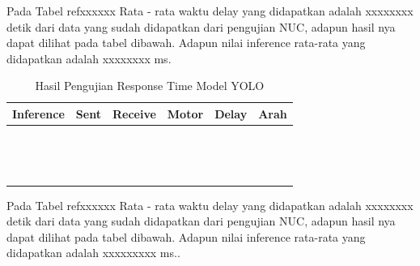 Pada Tabel refxxxxxx Rata - rata waktu delay yang didapatkan adalah xxxxxxxx detik dari data yang sudah didapatkan dari pengujian NUC, adapun hasil nya dapat dilihat pada tabel dibawah. Adapun nilai inference rata-rata yang didapatkan adalah  xxxxxxxx ms.



\begin{table}[H]
  \centering
  \label{tb:TabelHasilPengujianResponseTimeYOLO}
  \caption{Hasil Pengujian Response Time Model YOLO}
  \begin{tabular}{|l|l|l|l|l|l|}
  \hline
  Inference & Sent & Receive & Motor & Delay & Arah \\ \hline
            &      &         &       &       &      \\ \hline
            &      &         &       &       &      \\ \hline
            &      &         &       &       &      \\ \hline
            &      &         &       &       &      \\ \hline
            &      &         &       &       &      \\ \hline
            &      &         &       &       &      \\ \hline
            &      &         &       &       &      \\ \hline
            &      &         &       &       &      \\ \hline
            &      &         &       &       &      \\ \hline
            &      &         &       &       &      \\ \hline
            &      &         &       &       &      \\ \hline
            &      &         &       &       &      \\ \hline
            &      &         &       &       &      \\ \hline
            &      &         &       &       &      \\ \hline
  \end{tabular}
  \end{table}

Pada Tabel refxxxxxx Rata - rata waktu delay yang didapatkan adalah xxxxxxxx detik dari data yang sudah didapatkan dari pengujian NUC, adapun hasil nya dapat dilihat pada tabel dibawah. Adapun nilai inference rata-rata yang didapatkan adalah  xxxxxxxxx ms..

